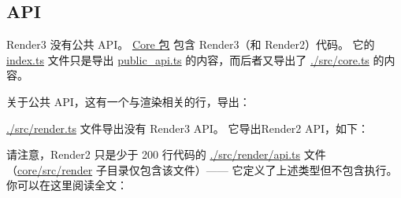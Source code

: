 \subsection{API}


Render3 没有公共 API。
\href{https://github.com/angular/angular/tree/master/packages/core}
{Core 包}
包含 Render3（和 Render2）代码。
它的
\href{https://github.com/angular/angular/blob/master/packages/core/index.ts}
{index.ts}
文件只是导出
\href{https://github.com/angular/angular/blob/master/packages/core/public_api.ts}
{public\_api.ts}
的内容，而后者又导出了
\href{https://github.com/angular/angular/blob/master/packages/core/src/core.ts}
{./src/core.ts}
的内容。


关于公共 API，这有一个与渲染相关的行，导出：




\href{https://github.com/angular/angular/blob/master/packages/core/src/render.ts}
{./src/render.ts}
文件导出没有 Render3 API。
它导出Render2 API，如下：




请注意，Render2 只是少于 200 行代码的
\href{https://github.com/angular/angular/blob/master/packages/core/src/render/api.ts}
{./src/render/api.ts}
文件（\href{https://github.com/angular/angular/tree/master/packages/core/src/render}
{core/src/render} 子目录仅包含该文件）—— 它定义了上述类型但不包含执行。
你可以在这里阅读全文：

